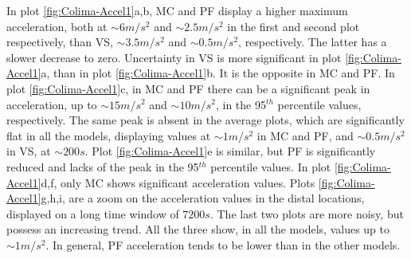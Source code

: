 \documentclass{article}
\begin{document}
In plot \ref{fig:Colima-Accel1}a,b, MC and PF display a higher maximum acceleration, both at $\sim 6 m/s^2$ and $\sim 2.5 m/s^2$ in the first and second plot respectively, than VS, $\sim 3.5 m/s^2$ and $\sim 0.5 m/s^2$, respectively. The latter has a slower decrease to zero. Uncertainty in VS is more significant in plot \ref{fig:Colima-Accel1}a, than in plot \ref{fig:Colima-Accel1}b. It is the opposite in MC and PF. In plot \ref{fig:Colima-Accel1}c, in MC and PF there can be a significant peak in acceleration, up to $\sim 15 m/s^2$ and $\sim 10 m/s^2$, in the 95$^{th}$ percentile values, respectively. The same peak is absent in the average plots, which are significantly flat in all the models, displaying values at $\sim 1 m/s^2$ in MC and PF, and $\sim 0.5 m/s^2$ in VS, at $\sim 200 s$. Plot \ref{fig:Colima-Accel1}e is similar, but PF is significantly reduced and lacks of the peak in the 95$^{th}$ percentile values. In plot \ref{fig:Colima-Accel1}d,f, only MC shows significant acceleration values. Plots \ref{fig:Colima-Accel1}g,h,i, are a zoom on the acceleration values in the distal locations, displayed on a long time window of $7200 s$. The last two plots are more noisy, but possess an increasing trend. All the three show, in all the models, values up to $\sim 1 m/s^2$. In general, PF acceleration tends to be lower than in the other models.
\end{document}
